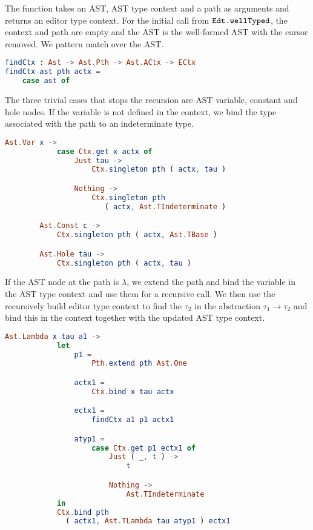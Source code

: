 The function  takes an AST, AST type context and a path as
arguments and returns an editor type context. For the initial call from
$\texttt{Edt.wellTyped}$, the context and path are empty and the AST is the
well-formed AST with the cursor removed. We pattern match over the AST.
\begin{lstlisting}[language=elm,%
                   gobble=0,%
                   ]
findCtx : Ast -> Ast.Pth -> Ast.ACtx -> ECtx
findCtx ast pth actx =
    case ast of
\end{lstlisting}
The three trivial cases that stops the recursion are AST variable, constant and
hole nodes. If the variable is not defined in the context, we bind the type
associated with the path to an indeterminate type.
\begin{lstlisting}[language=elm,%
                   gobble=8,%
                   ]
        Ast.Var x ->
            case Ctx.get x actx of
                Just tau ->
                    Ctx.singleton pth ( actx, tau )

                Nothing ->
                    Ctx.singleton pth
                       ( actx, Ast.TIndeterminate )

        Ast.Const c ->
            Ctx.singleton pth ( actx, Ast.TBase )

        Ast.Hole tau ->
            Ctx.singleton pth ( actx, tau )
\end{lstlisting}
If the AST node at the path is $\lambda$, we extend the path and bind the
variable in the AST type context and use them for a recursive call. We then use
the recursively build editor type context to find the $\tau_2$ in the
abstraction $\tau_1\to\tau_2$ and bind this in the context together with the
updated AST type context.
\begin{lstlisting}[language=elm,%
                   gobble=8,%
                   ]
        Ast.Lambda x tau a1 ->
            let
                p1 =
                    Pth.extend pth Ast.One

                actx1 =
                    Ctx.bind x tau actx

                ectx1 =
                    findCtx a1 p1 actx1

                atyp1 =
                    case Ctx.get p1 ectx1 of
                        Just ( _, t ) ->
                            t

                        Nothing ->
                            Ast.TIndeterminate
            in
            Ctx.bind pth
              ( actx1, Ast.TLambda tau atyp1 ) ectx1
\end{lstlisting}
